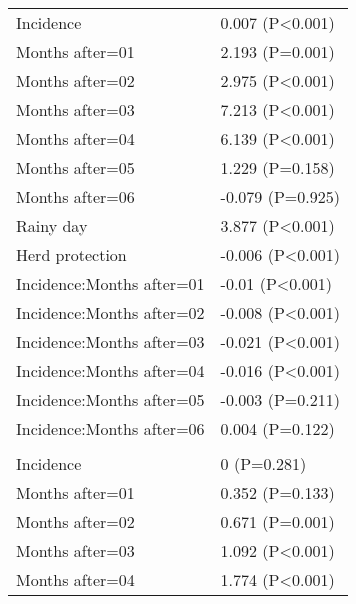 \documentclass[]{article}
\begin{document}
\begin{longtable}[t]{ll}
\hspace{1em}Incidence & 0.007 (P<0.001)\\
\hspace{1em}Months after=01 & 2.193 (P=0.001)\\
\hspace{1em}Months after=02 & 2.975 (P<0.001)\\
\hspace{1em}Months after=03 & 7.213 (P<0.001)\\
\hspace{1em}Months after=04 & 6.139 (P<0.001)\\
\hspace{1em}Months after=05 & 1.229 (P=0.158)\\
\hspace{1em}Months after=06 & -0.079 (P=0.925)\\
\hspace{1em}Rainy day & 3.877 (P<0.001)\\
\hspace{1em}Herd protection & -0.006 (P<0.001)\\
\hspace{1em}Incidence:Months after=01 & -0.01 (P<0.001)\\
\hspace{1em}Incidence:Months after=02 & -0.008 (P<0.001)\\
\hspace{1em}Incidence:Months after=03 & -0.021 (P<0.001)\\
\hspace{1em}Incidence:Months after=04 & -0.016 (P<0.001)\\
\hspace{1em}Incidence:Months after=05 & -0.003 (P=0.211)\\
\hspace{1em}Incidence:Months after=06 & 0.004 (P=0.122)\\
\addlinespace[1.5em]
\multicolumn{2}{l}{\textbf{Temporary field worker}}\\
\hspace{1em}Incidence & 0 (P=0.281)\\
\hspace{1em}Months after=01 & 0.352 (P=0.133)\\
\hspace{1em}Months after=02 & 0.671 (P=0.001)\\
\hspace{1em}Months after=03 & 1.092 (P<0.001)\\
\hspace{1em}Months after=04 & 1.774 (P<0.001)\\

\end{longtable}
\end{document}
